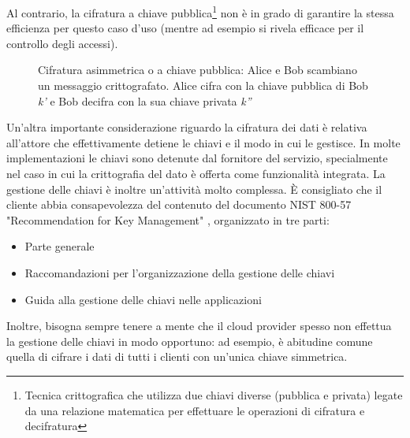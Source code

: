 \documentclass[../main.tex]{subfiles}
\begin{document}
Al contrario, la cifratura a chiave pubblica\footnote{Tecnica crittografica che utilizza due chiavi diverse (pubblica e privata) legate da una relazione matematica per effettuare le operazioni di cifratura e decifratura} non è in grado di garantire la stessa efficienza per questo caso d'uso \cite{CloudSecurityBook} (mentre ad esempio si rivela efficace per il controllo degli accessi).

\begin{figure}[H]
\centering
{}
\caption[Cifratura asimmetrica o a chiave pubblica]{Cifratura asimmetrica o a chiave pubblica: Alice e Bob scambiano un messaggio crittografato. Alice cifra con la chiave pubblica di Bob \textit{k'} e Bob decifra con la sua chiave privata \textit{k''}}\label{fig:cifraturaasimmetrica}
\end{figure}

Un'altra importante considerazione riguardo la cifratura dei dati è relativa all'attore che effettivamente detiene le chiavi e il modo in cui le gestisce. In molte implementazioni le chiavi sono detenute dal fornitore del servizio, specialmente nel caso in cui la crittografia del dato è offerta come funzionalità integrata.
La gestione delle chiavi è inoltre un'attività molto complessa.
\`E consigliato che il cliente abbia consapevolezza del contenuto del documento NIST 800-57 "Recommendation for Key Management" \cite{NISTKeys}, organizzato in tre parti: \cite{CloudSecurityBook}
\begin{itemize}
\item Parte generale
\item Raccomandazioni per l'organizzazione della gestione delle chiavi
\item Guida alla gestione delle chiavi nelle applicazioni
\end{itemize}
Inoltre, bisogna sempre tenere a mente che il cloud provider spesso non effettua la gestione delle chiavi in modo opportuno: ad esempio, è abitudine comune quella di cifrare i dati di tutti i clienti con un'unica chiave simmetrica.
\end{document}
